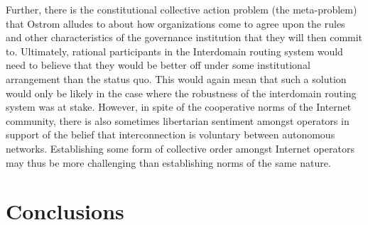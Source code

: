 Further, there is the constitutional collective action problem (the
meta-problem) that Ostrom alludes to about how organizations come to agree upon
the rules and other characteristics of the governance institution that they
will then commit to. Ultimately, rational participants in the Interdomain
routing system would need to believe that they would be better off under some
institutional arrangement than the status quo. This would again mean that such
a solution would only be likely in the case where the robustness of the
interdomain routing system was at stake. However, in spite of the cooperative
norms of the Internet community, there is also sometimes libertarian sentiment
amongst operators in support of the belief that interconnection is voluntary
between autonomous networks. Establishing some form of collective order amongst
Internet operators may thus be more challenging than establishing norms of the
same nature.




%
%

\section{Conclusions}

